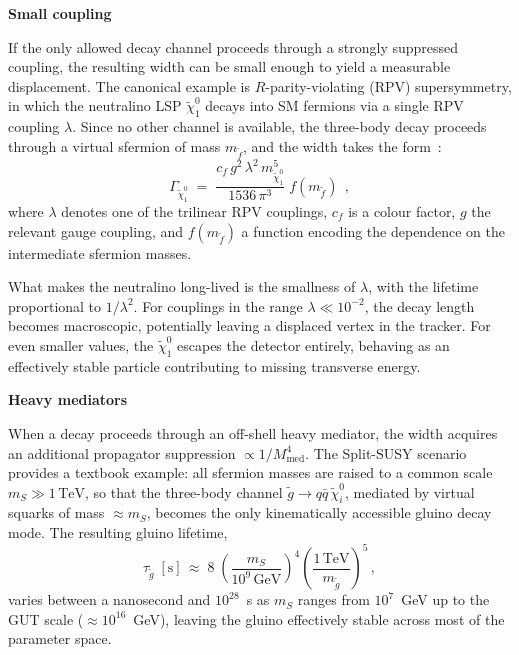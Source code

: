 \vspace{0.5 cm}
\noindent \textbf{Small coupling}
\vspace{0.5 cm}

If the only allowed decay channel proceeds through a strongly suppressed coupling, the resulting width can be small enough to yield a measurable displacement. The canonical example is $R$-parity-violating (RPV) supersymmetry, in which the neutralino LSP $\tilde{\chi}^0_1$ decays into SM fermions via a single RPV coupling $\lambda$. Since no other channel is available, the three-body decay proceeds through a virtual sfermion of mass $m_{\tilde{f}}$, and the width takes the form~\cite{Sierra_2008}:
\begin{equation}
    \Gamma_{\tilde{\chi}^0_1} \;=\;
    \frac{c_f\, g^{2}\, \lambda^{2}\, m_{\tilde{\chi}^0_1}^{5}}
    {1536\,\pi^{3}}\; f(m_{\tilde{f}})\;\,,
    \label{eq:rpv_neutralino}
\end{equation}
where $\lambda$ denotes one of the trilinear RPV couplings, $c_f$ is a colour factor, $g$ the relevant gauge coupling, and $f(m_{\tilde{f}})$ a function encoding the dependence on the intermediate sfermion masses.

What makes the neutralino long-lived is the smallness of $\lambda$, with the lifetime proportional to $1/\lambda^2$. For couplings in the range $\lambda \ll 10^{-2}$, the decay length becomes macroscopic, potentially leaving a displaced vertex in the tracker. For even smaller values, the $\tilde{\chi}^0_1$ escapes the detector entirely, behaving as an effectively stable particle contributing to missing transverse energy.


\vspace{0.5 cm}
\noindent \textbf{Heavy mediators}
\vspace{0.5 cm}

When a decay proceeds through an off-shell heavy mediator, the width acquires an additional propagator suppression $\propto 1/M_{\mathrm{med}}^{4}$. The Split-SUSY scenario~\cite{ArkaniHamed:2004fb, Giudice:2004tc} provides a textbook example: all sfermion masses are raised to a common scale $m_{S} \gg 1\,\mathrm{TeV}$, so that the three-body channel $\tilde{g} \to q\bar{q}\,\tilde{\chi}_{i}^{0}$, mediated by virtual squarks of mass ${\approx} m_S$, becomes the only kinematically accessible gluino decay mode. The resulting gluino lifetime,
\begin{equation}
    \tau_{\tilde{g}} \; [\text{s}] \,\approx\; 8\;
    \left(\frac{m_{S}}{10^{9}\,\mathrm{GeV}}\right)^{4}
    \left(\frac{1\,\mathrm{TeV}}{m_{\tilde{g}}}\right)^{5}\,,
    \label{eq:gluino_lifetime}
\end{equation}
varies between a nanosecond and $10^{28}$~s as $m_{S}$ ranges from $10^7$~GeV up to the GUT scale (${\approx}10^{16}$~GeV), leaving the gluino effectively stable across most of the parameter space.

